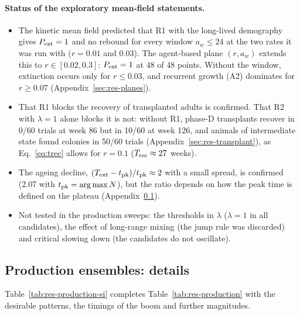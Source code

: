 \paragraph{Status of the exploratory mean-field statements.}
\begin{itemize}
  \item The kinetic mean field predicted that R1 with the long-lived demography gives $P_{\rm ext}=1$ and no rebound
    for every window $a_w\le24$ at the two rates it was run with ($r=0.01$ and $0.03$). The agent-based plane
    $(r,a_w)$ extends this to $r\in[0.02,0.3]$: $P_{\rm ext}=1$ at 48 of 48 points. Without the window, extinction
    occurs only for $r\le0.03$, and recurrent growth (A2) dominates for $r\ge0.07$ (Appendix~\ref{sec:res-planes}).
  \item That R1 blocks the recovery of transplanted adults is confirmed. That R2 with $\lambda=1$ alone blocks it is
    not: without R1, phase-D transplants recover in 0/60 trials at week 86 but in 10/60 at week 126, and animals of
    intermediate state found colonies in 50/60 trials (Appendix~\ref{sec:res-transplant}), as Eq.~\eqref{eq:trec}
    allows for $r=0.1$ ($T_{\rm rec}\approx27$ weeks).
  \item The ageing decline, $(T_{\rm ext}-t_{\rm pk})/t_{\rm pk}\approx2$ with a small spread, is confirmed (2.07
    with $t_{\rm pk}=\arg\max N$), but the ratio depends on how the peak time is defined on the plateau
    (Appendix~\ref{app:res-production}).
  \item Not tested in the production sweeps: the thresholds in $\lambda$ ($\lambda=1$ in all candidates), the effect
    of long-range mixing (the jump rule was discarded) and critical slowing down (the candidates do not oscillate).
\end{itemize}

\subsection{Production ensembles: details}
\label{app:res-production}

Table~\ref{tab:res-production-si} completes Table~\ref{tab:res-production} with the desirable patterns, the timings
of the boom and further magnitudes.


